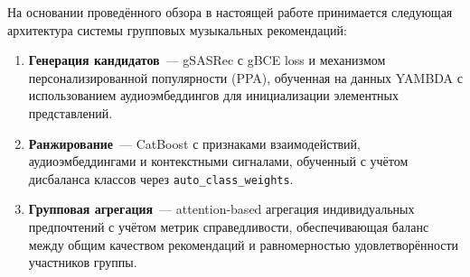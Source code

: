 На основании проведённого обзора в настоящей работе принимается следующая архитектура системы групповых музыкальных рекомендаций:
\begin{enumerate}
    \item \textbf{Генерация кандидатов}~--- gSASRec с gBCE loss и механизмом персонализированной популярности (PPA), обученная на данных YAMBDA с использованием аудиоэмбеддингов для инициализации элементных представлений.
    \item \textbf{Ранжирование}~--- CatBoost с признаками взаимодействий, аудиоэмбеддингами и контекстными сигналами, обученный с учётом дисбаланса классов через \texttt{auto\_class\_weights}.
    \item \textbf{Групповая агрегация}~--- attention-based агрегация индивидуальных предпочтений с учётом метрик справедливости, обеспечивающая баланс между общим качеством рекомендаций и равномерностью удовлетворённости участников группы.
\end{enumerate}

